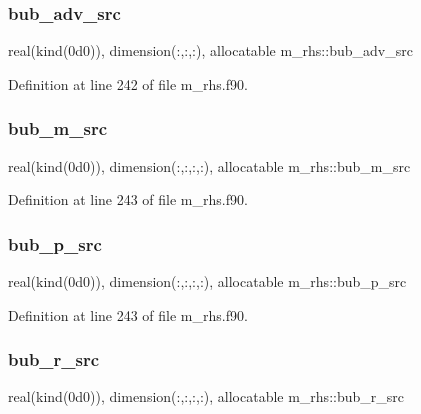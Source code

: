 \subsubsection{\texorpdfstring{bub\+\_\+adv\+\_\+src}{bub\_adv\_src}}
{\footnotesize\ttfamily real(kind(0d0)), dimension(\+:,\+:,\+:), allocatable m\+\_\+rhs\+::bub\+\_\+adv\+\_\+src}



Definition at line 242 of file m\+\_\+rhs.\+f90.

\mbox{\label{namespacem__rhs_a45d112ac19bd1a893d86a1a49fd6d6b6}} 
\subsubsection{\texorpdfstring{bub\+\_\+m\+\_\+src}{bub\_m\_src}}
{\footnotesize\ttfamily real(kind(0d0)), dimension(\+:,\+:,\+:,\+:), allocatable m\+\_\+rhs\+::bub\+\_\+m\+\_\+src}



Definition at line 243 of file m\+\_\+rhs.\+f90.

\mbox{\label{namespacem__rhs_ab0521faf3afa606d8ebfd272176f3301}} 
\subsubsection{\texorpdfstring{bub\+\_\+p\+\_\+src}{bub\_p\_src}}
{\footnotesize\ttfamily real(kind(0d0)), dimension(\+:,\+:,\+:,\+:), allocatable m\+\_\+rhs\+::bub\+\_\+p\+\_\+src}



Definition at line 243 of file m\+\_\+rhs.\+f90.

\mbox{\label{namespacem__rhs_ab1f280657ebd60c51baf22e79dffaeb2}} 
\subsubsection{\texorpdfstring{bub\+\_\+r\+\_\+src}{bub\_r\_src}}
{\footnotesize\ttfamily real(kind(0d0)), dimension(\+:,\+:,\+:,\+:), allocatable m\+\_\+rhs\+::bub\+\_\+r\+\_\+src}



